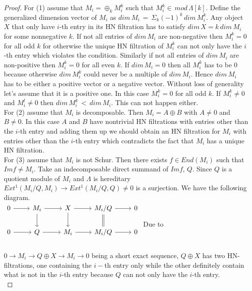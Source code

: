 \begin{proof}
\indent For (1) assume that $M_i = \oplus_{k}M_i^k$ such that $M_i^k\in\, mod\, \Lambda[k]$. Define the generalized dimension vector of $M_i$ as $dim\, M_i\, =\, \Sigma_k (-1)^k\,dim\,M_i^k$. Any object $X$ that only have $i$-th entry in its HN filtration has to satisfy $dim\,X = k\,dim\,M_i$ for some nonnegative $k$.  If not all entries of $dim\, M_i$ are non-negative then $M_i^k = 0$ for all odd $k$ for otherwise the unique HN filtration of $M_i^k$ can not only have the $i$-th entry which violates the condition. Similarly if not all entries of $dim\, M_i$ are non-positive then $M_i^k = 0$ for all even $k$. If $dim\, M_i = 0$ then all $M_i^k$ has to be 0 because otherwise $dim\,M_i^k$ could never be a multiple of $dim\,M_i$. Hence $dim\, M_i$ has to be either a positive vector or a negative vector. Without loss of generality let's assume that it is a positive one. In this case $M_i^k = 0$ for all odd $k$. If $M_i^k \neq 0$ and $M_i^l\neq 0$ then $dim\,M_i^k\,<\,dim\,M_i$. This can not happen either.\\
\indent For (2) assume that $M_i$ is decomposable. Then $M_i = A\oplus B$ with $A\neq 0$ and $B\neq 0$. In this case $A$ and $B$ have nontrivial HN filtrations with entries other than the $i$-th entry and adding them up we should obtain an HN filtration for $M_i$ with entries other than the $i$-th entry which contradicts the fact that $M_i$ has a unique HN filtration.\\
\indent For (3) assume that $M_i$ is not Schur. Then there exists $f\in End(M_i)$ such that $Im f\neq M_i$. Take an indecomposable direct summand of $Im f$, $Q$. Since $Q$ is a quotient module of $M_i$ and $\Lambda$ is hereditary $Ext^1(M_i/Q, M_i)\to Ext^1(M_i/Q, Q) \neq 0$ is a surjection. We have the following diagram.\\
$\begin{tikzcd}
0\arrow[r] & M_i\arrow[r]\arrow[d] & X\arrow[r]\arrow[d] & M_i/Q \arrow[r]\arrow[d,equal] & 0\\
0\arrow[r] & Q \arrow[r] & M_i\arrow[r] & M_i/Q \arrow[r] & 0\\
\end{tikzcd}$
\indent Due to $0\to M_i\to Q\oplus X\to M_i\to 0$ being a short exact sequence, $Q\oplus X$ has two HN-filtrations, one containing the $i-$th entry only while the other definitely contain what is not in the $i$-th entry because $Q$ can not only have the $i$-th entry.\\
\end{proof}
